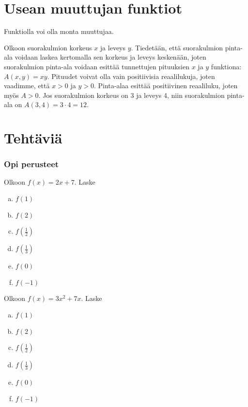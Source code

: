 \section{Usean muuttujan funktiot}

Funktiolla voi olla monta muuttujaa. 


\begin{esimerkki}
Olkoon suorakulmion korkeus $x$ ja leveys $y$. Tiedetään, että suorakulmion pinta-ala voidaan laskea kertomalla sen korkeus ja leveys keskenään, joten suorakulmion pinta-ala voidaan esittää tunnettujen pituuksien $x$ ja $y$ funktiona: $A(x, y)=xy$. Pituudet voivat olla vain positiivisia reaalilukuja, joten vaadimme, että $x>0$ ja $y>0$. Pinta-alaa esittää positiivinen reaaliluku, joten myös $A>0$. Jos suorakulmion korkeus on 3 ja leveys 4, niin suorakulmion pinta-ala on $A(3, 4)=3\cdot 4=12$.
\end{esimerkki}

\section*{Tehtäviä}

\subsubsection*{Opi perusteet}

\begin{tehtava}
Olkoon $f(x)=2x+7$. Laske
\begin{enumerate}[a)]
\item $f(1)$
\item $f(2)$
\item $f(\frac{1}{2})$
\item $f(\frac{1}{3})$
\item $f(0)$
\item $f(-1)$
\end{enumerate}
\end{tehtava}

\begin{tehtava}
Olkoon $f(x)=3x^2+7x$. Laske
\begin{enumerate}[a)]
\item $f(1)$
\item $f(2)$
\item $f(\frac{1}{2})$
\item $f(\frac{1}{3})$
\item $f(0)$
\item $f(-1)$
\end{enumerate}
\end{tehtava}

